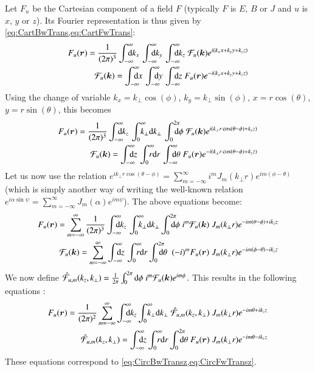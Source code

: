 Let $F_u$ be the Cartesian component of a field $F$ 
(typically $F$ is $E$, $B$ or $J$ and $u$ is $x$, $y$ or $z$). Its Fourier representation
is thus given by \cref{eq:CartBwTrans,eq:CartFwTrans}:
\begin{align}
F_u(\vec{r}) = \frac{1}{(2\pi)^{3}}\Integ{k_x} \,\Integ{k_y}\,
\Integ{k_z} \; \mathcal{F}_u(\vec{k}) e^{i(k_x x + k_y y + k_z z)} \\
\mathcal{F}_u(\vec{k})  = \Integ{x} \,\Integ{y}\,
\Integ{z} \; F_u(\vec{r}) e^{-i(k_x x + k_y y + k_z z)} 
\end{align}
Using the change of variable $k_x=k_\perp\cos(\phi)$, $k_y = k_\perp\sin(\phi)$,
$x=r\cos(\theta)$, $y=r\sin(\theta)$, this becomes
 \begin{align}
F_u(\vec{r}) = \frac{1}{(2\pi)^{3}}\Integ{k_z} \,\RInteg{k_\perp}\,
\TInteg{\phi} \; \mathcal{F}_u(\vec{k})
e^{i(k_\perp r \cos(\theta-\phi) + k_z z)} \\
\mathcal{F}_u(\vec{k})   = \Integ{z} \,\RInteg{r}\,
\Integ{\theta} \; F_u(\vec{r}) e^{-i(k_\perp r \cos(\theta-\phi) + k_z z)} 
\end{align}
Let us now use the relation $e^{ik_\perp r\cos(\theta-\phi)} =
\sum_{m=-\infty}^{\infty} i^m J_m(k_\perp r) e^{im(\phi-\theta)}$
(which is simply another way of writing the well-known relation
$e^{i \alpha \sin \psi} =\sum_{m=-\infty}^{\infty}J_m(\alpha)e^{im\psi}$). The above equations become:
\begin{align}
F_u (\vec{r})  = \sum_{m=-\infty}^{\infty} \frac{1}{(2\pi)^{3}}\Integ{k_z} \,\RInteg{k_\perp }
\TInteg{\phi} \; i^m \mathcal{F}_u(\vec{k}) \;
J_m(k_\perp r) e^{-im(\theta-\phi) + ik_z z} \\
\mathcal{F}_u(\vec{k})   =  \sum_{m=-\infty}^{\infty} \Integ{z} \,\RInteg{r}
\TInteg{\theta} \;\; (-i)^m F_u(\vec{r}) \; J_m(k_\perp r) e^{-im(\phi-\theta) -ik_z z} 
\end{align}
We now define $\hat{\mathcal{F}}_{u,m}(k_z,k_\perp ) = \frac{1}{2\pi}\int_0^{2\pi}
\mathrm{d}\phi \; i^m \mathcal{F}_u(\boldsymbol{k})
e^{im\phi}$. This results in the following equations :
\begin{align}
F_u(\vec{r}) =  \frac{1}{(2\pi)^2}\sum_{m=-\infty}^{\infty} \Integ{k_z}
\RInteg{k_\perp }\; \spectral{F}_{u,m}(k_z,k_\perp ) \; J_m(k_\perp r) e^{-im\theta + ik_z z} 
\\
\spectral{F}_{u,m}(k_z,k_\perp ) = \Integ{z} \RInteg{r}
\TInteg{\theta} \;F_u(\vec{r})\; J_m(k_\perp r) e^{-im\theta
 - i k_z z} \label{eq:CircBwTransu}
\end{align}
These equations correspond to \cref{eq:CircBwTransz,eq:CircFwTransz}.

